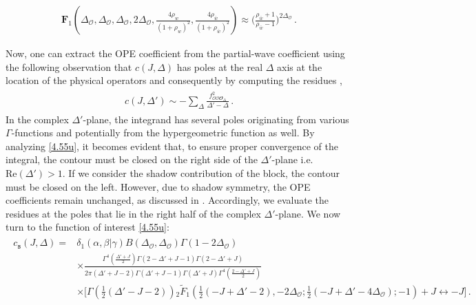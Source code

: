 \begin{align} \label{approx1}
\mathbf{F}_{1}\left(\Delta_{\mathcal{O}},\Delta_{\mathcal{O}},\Delta_{\mathcal{O}},2\Delta_{\mathcal{O}},\frac{4\rho_w}{(1+\rho_w)^2},\frac{4\rho_{\bar{w}}}{(1+\rho_{\bar{w}})^2}\right)\approx \Bigg(\frac{\rho_{\bar w}+1}{\rho_{\bar w}-1}\Bigg)^{2\Delta_{\mathcal{O}}}\,.
\end{align}




\par 
Now, one can extract the OPE coefficient from the partial-wave coefficient using the following observation that $c(J,\Delta)$ has poles at the real $\Delta$ axis at the location of the physical operators and consequently by computing the residues \cite{Liu:2020tpf,Caron-Huot:2017vep},
\begin{align}
    \begin{split}
        c(J,\Delta')\sim -\sum_{\Delta}\frac{f^2_{\mathcal{O}\mathcal{O}\mathbfcal{O}_{\Delta}}}{\Delta'-\Delta}\,.
    \end{split}
\end{align}
\noindent
In the complex \(\Delta'\)-plane, the integrand has several poles originating from various \(\Gamma\)-functions and potentially from the hypergeometric function as well. By analyzing \eqref{4.55u}, it becomes evident that, to ensure proper convergence of the integral, the contour must be closed on the right side of the \(\Delta'\)-plane i.e. $\textrm{Re}(\Delta')>1$. If we consider the shadow contribution of the block, the contour must be closed on the left. However, due to shadow symmetry, the OPE coefficients remain unchanged, as discussed in \cite{Caron-Huot:2017vep}. Accordingly, we evaluate the residues at the poles that lie in the right half of the complex \(\Delta'\)-plane. We now turn to the function of interest \eqref{4.55u}:
\begin{align}
    \begin{split}
      c_{\texttt{s}}(J,\Delta)=&\delta_1(\alpha,\beta|\gamma) B\left(\Delta_{\mathcal{O}},\Delta_{\mathcal{O}}\right)\Gamma(1-2\Delta_{\mathcal{O}})\\&\times\frac{\Gamma^4 \left(\frac{\Delta'+J}{2}\right)\Gamma(2-\Delta'+J-1)\Gamma(2-\Delta'+J)}{2\pi(\Delta'+J-2)\Gamma(\Delta'+J-1)\Gamma(\Delta'+J)\Gamma^4\left(\frac{2-\Delta'+J}{2}\right)}\\
&\times \Bigg[\Gamma\left(\frac{1}{2}(\Delta'-J-2)\right){_2}\tilde{F}_1\left(\frac{1}{2} (-J+\Delta' -2),-2 \Delta_{\mathcal{O}} ;\frac{1}{2} (-J+\Delta' -4 \Delta_{\mathcal{O}} );-1\right)+J\leftrightarrow-J \Bigg]\,.\label{4.36l}
    \end{split}
\end{align}
